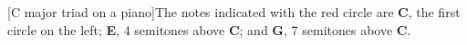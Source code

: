 [C major triad on a piano]The notes indicated with the red circle are \textbf{C}, the first circle on the left; \textbf{E}, 4 semitones above \textbf{C}; and \textbf{G}, 7 semitones above \textbf{C}.